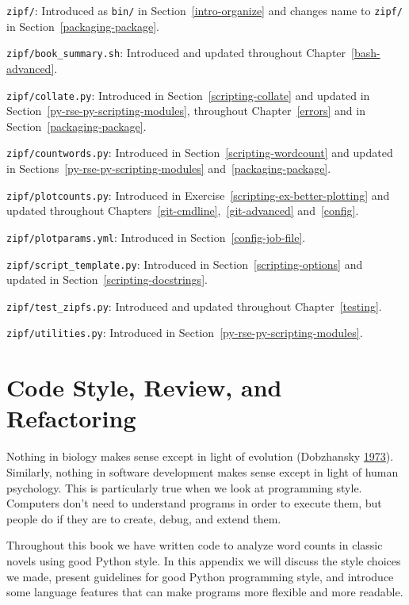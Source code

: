 \documentclass[
]{krantz}
\begin{document}
\texttt{zipf/}: Introduced as \texttt{bin/} in Section~\ref{intro-organize} and
changes name to \texttt{zipf/} in Section~\ref{packaging-package}.

\texttt{zipf/book\_summary.sh}: Introduced and updated throughout Chapter~\ref{bash-advanced}.

\texttt{zipf/collate.py}: Introduced in Section~\ref{scripting-collate} and
updated in Section~\ref{py-rse-py-scripting-modules},
throughout Chapter~\ref{errors} and in Section~\ref{packaging-package}.

\texttt{zipf/countwords.py}: Introduced in Section~\ref{scripting-wordcount} and
updated in Sections~\ref{py-rse-py-scripting-modules} and~\ref{packaging-package}.

\texttt{zipf/plotcounts.py}: Introduced in Exercise~\ref{scripting-ex-better-plotting} and
updated throughout Chapters~\ref{git-cmdline},~\ref{git-advanced} and~\ref{config}.

\texttt{zipf/plotparams.yml}: Introduced in Section~\ref{config-job-file}.

\texttt{zipf/script\_template.py}: Introduced in Section~\ref{scripting-options} and
updated in Section~\ref{scripting-docstrings}.

\texttt{zipf/test\_zipfs.py}: Introduced and updated throughout Chapter~\ref{testing}.

\texttt{zipf/utilities.py}: Introduced in Section~\ref{py-rse-py-scripting-modules}.

\hypertarget{style}{%
\chapter{Code Style, Review, and Refactoring}\label{style}}

Nothing in biology makes sense except in light of evolution (Dobzhansky \protect\hyperlink{ref-Dobz1973}{1973}).
Similarly,
nothing in software development makes sense except in light of human psychology.
This is particularly true when we look at programming style.
Computers don't need to understand programs in order to execute them,
but people do if they are to create, debug, and extend them.

Throughout this book we have written code to analyze word counts in classic novels
using good Python style.
In this appendix we will discuss the style choices we made,
present guidelines for good Python programming style,
and introduce some language features that can make programs more flexible and more readable.
\end{document}
